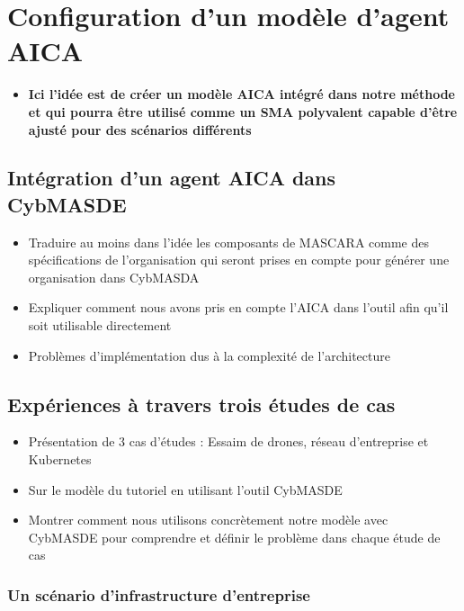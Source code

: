 \chapter{Configuration d'un modèle d'agent AICA}\label{ch:case_studies} %

\begin{itemize}
    \item \textbf{Ici l'idée est de créer un modèle AICA intégré dans notre méthode et qui pourra être utilisé comme un SMA polyvalent capable d'être ajusté pour des scénarios différents}
\end{itemize}


\section{Intégration d'un agent AICA dans CybMASDE}
\begin{itemize}
    \item Traduire au moins dans l'idée les composants de MASCARA comme des spécifications de l'organisation qui seront prises en compte pour générer une organisation dans CybMASDA
    \item Expliquer comment nous avons pris en compte l'AICA dans l'outil afin qu'il soit utilisable directement
    \item Problèmes d'implémentation dus à la complexité de l'architecture
\end{itemize}


\section{Expériences à travers trois études de cas}
\begin{itemize}
    \item Présentation de 3 cas d'études : Essaim de drones, réseau d'entreprise et Kubernetes
    \item Sur le modèle du tutoriel en utilisant l'outil CybMASDE
    \item Montrer comment nous utilisons concrètement notre modèle avec CybMASDE pour comprendre et définir le problème dans chaque étude de cas
\end{itemize}

\subsection{Un scénario d'infrastructure d'entreprise}

